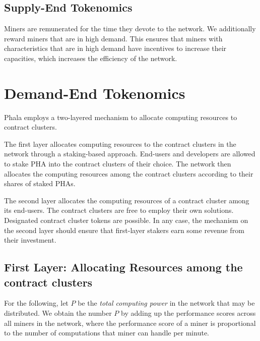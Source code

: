 \documentclass[11pt, a4paper, twocolumn]{article}
\begin{document}
\subsection{Supply-End Tokenomics} 
Miners are remunerated for the time they devote to the network. We additionally reward miners that are in high demand. This ensures that miners with characteristics that are in high demand have incentives to increase their capacities, which increases the efficiency of the network.


\section{Demand-End Tokenomics}\label{sec:deman}
Phala employs a two-layered mechanism to allocate computing resources to contract clusters. 

The first layer allocates computing resources to the contract clusters in the network through a staking-based approach. End-users and developers are allowed to stake PHA into the contract clusters of their choice. The network then allocates the computing resources among the contract clusters according to their shares of staked PHAs.%

The second layer allocates the computing resources of a contract cluster among its end-users. The contract clusters are free to employ their own solutions. Designated contract cluster tokens are possible. In any case, the mechanism on the second layer should ensure that first-layer stakers earn some revenue from their investment.


\subsection{First Layer: Allocating Resources among the contract clusters} 
%
For the following, let $P$ be the \textit{total computing power} in the network that may be distributed. We obtain the number $P$ by adding up the performance scores across all miners in the network, where the performance score of a miner is proportional to the number of computations that miner can handle per minute. 
\end{document}
